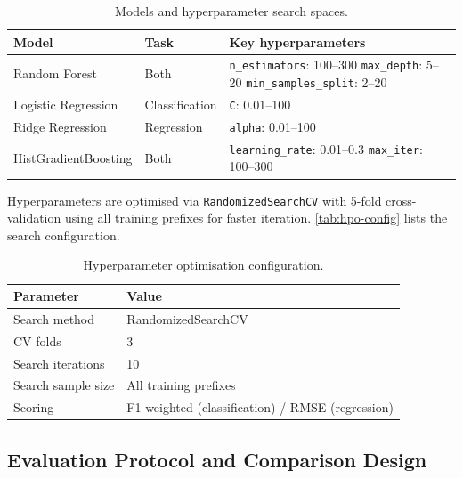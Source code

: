 \documentclass[runningheads]{llncs}
\begin{document}
\begin{table}[H]
    \centering
    \caption{Models and hyperparameter search spaces.}
    \label{tab:models}
    \begin{tabularx}{\textwidth}{llX}
        \toprule
        Model & Task & Key hyperparameters \\
        \midrule
        Random Forest & Both &
            \texttt{n\_estimators}: 100--300\newline
            \texttt{max\_depth}: 5--20\newline
            \texttt{min\_samples\_split}: 2--20 \\
        Logistic Regression & Classification & \texttt{C}: 0.01--100 \\
        Ridge Regression & Regression & \texttt{alpha}: 0.01--100 \\
        HistGradientBoosting & Both &
            \texttt{learning\_rate}: 0.01--0.3\newline
            \texttt{max\_iter}: 100--300 \\
        \bottomrule
    \end{tabularx}
\end{table}

Hyperparameters are optimised via \texttt{RandomizedSearchCV} with
5-fold cross-validation using all training prefixes for faster
iteration.
\autoref{tab:hpo-config} lists the search configuration.

\begin{table}[H]
    \centering
    \caption{Hyperparameter optimisation configuration.}
    \label{tab:hpo-config}
    \begin{tabularx}{0.7\textwidth}{lX}
        \toprule
        Parameter & Value \\
        \midrule
        Search method & RandomizedSearchCV \\
        CV folds & 3 \\
        Search iterations & 10 \\
        Search sample size & All training prefixes \\
        Scoring & F1-weighted (classification) / RMSE (regression) \\
        \bottomrule
    \end{tabularx}
\end{table}

\subsection{Evaluation Protocol and Comparison Design}
\label{sec:metrics}
\end{document}
